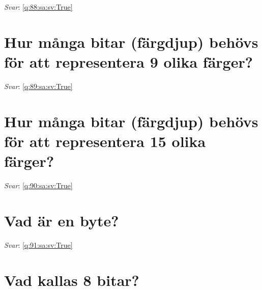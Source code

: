 \documentclass[a4paper,11pt,oneside]{book}
\begin{document}
\begin{sloppypar}
\textit{Svar}: \autoref{q:88:sa:sv:True}



\section{Hur m\r{a}nga bitar (f\"argdjup) beh\"ovs f\"or att representera 9 olika f\"arger?}

\label{q:89:sa:sv:False}

\vspace{2cm}

\noindent\makebox[\textwidth]{\hrulefill}

\vspace{1cm}

\textit{Svar}: \autoref{q:89:sa:sv:True}



\section{Hur m\r{a}nga bitar (f\"argdjup) beh\"ovs f\"or att representera 15 olika f\"arger?}

\label{q:90:sa:sv:False}

\vspace{2cm}

\noindent\makebox[\textwidth]{\hrulefill}

\vspace{1cm}

\textit{Svar}: \autoref{q:90:sa:sv:True}



\section{Vad \"ar en byte?}

\label{q:91:sa:sv:False}

\vspace{2cm}

\noindent\makebox[\textwidth]{\hrulefill}

\vspace{1cm}

\textit{Svar}: \autoref{q:91:sa:sv:True}



\section{Vad kallas 8 bitar?}

\label{q:92:sa:sv:False}


\end{sloppypar}
\end{document}
